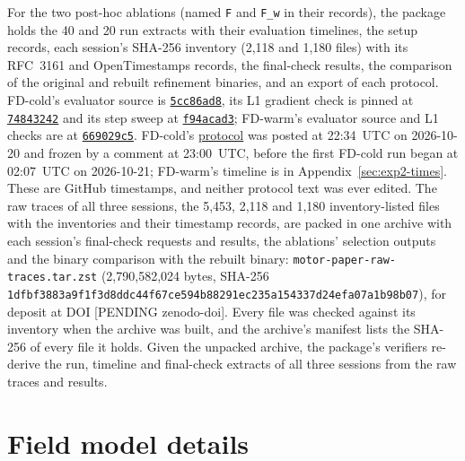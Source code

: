 \documentclass{anvil-paper}
\begin{document}
For the two post-hoc ablations (named \texttt{F} and \texttt{F\_w} in their records), the package holds the 40 and 20 run
extracts with their evaluation timelines, the setup records, each session's SHA-256 inventory (2,118 and
1,180 files) with its RFC~3161 and OpenTimestamps records, the final-check
results, the comparison of the original and rebuilt refinement binaries,
and an export of each protocol. FD-cold's evaluator source is
\href{https://github.com/rjwalters/geode-fem/tree/5cc86ad81aeea4847a2608fcafde22a1bbfb6990/benchmarks/motor_optimization}{\texttt{5cc86ad8}},
its L1 gradient check is pinned at
\href{https://github.com/rjwalters/geode-fem/tree/74843242db03e8d57edf971420171064bf19f107/benchmarks/motor_optimization/harness}{\texttt{74843242}}
and its step sweep at
\href{https://github.com/rjwalters/geode-fem/tree/f94acad3f312c7d417830ff82b66a78a1ea89fb2/benchmarks/motor_optimization/harness}{\texttt{f94acad3}};
FD-warm's evaluator source and L1 checks are at
\href{https://github.com/rjwalters/geode-fem/tree/669029c5653cb5fe4724ec0c7525ba60c770975e/benchmarks/motor_optimization}{\texttt{669029c5}}.
FD-cold's \href{https://github.com/rjwalters/geode-fem/issues/1218}{protocol}
was posted at 22:34~UTC on 2026-10-20 and frozen by a comment at
23:00~UTC, before the first FD-cold run began at 02:07~UTC on 2026-10-21;
FD-warm's timeline is in Appendix~\ref{sec:exp2-times}. These are GitHub
timestamps, and neither protocol text was ever edited. The raw traces of all
three sessions, the 5,453, 2,118 and 1,180 inventory-listed files with the
inventories and their timestamp records, are packed in one archive with
each session's final-check requests and results, the ablations' selection
outputs and the binary comparison with the rebuilt binary:
\texttt{motor-paper-raw-traces.tar.zst} (2,790,582,024 bytes, SHA-256
\texttt{1dfbf3883a9f1f3d8ddc44f67ce594b8}\allowbreak\texttt{8291ec235a154337d24efa07a1b98b07}), for deposit at
DOI [PENDING zenodo-doi]. Every file was checked against its inventory
when the archive was built, and the archive's manifest lists the SHA-256
of every file it holds. Given the unpacked archive, the package's verifiers
re-derive the run, timeline and final-check extracts of all three sessions
from the raw traces and results.

\appendix
\section{Field model details}\label{sec:fieldmodel}
\end{document}
